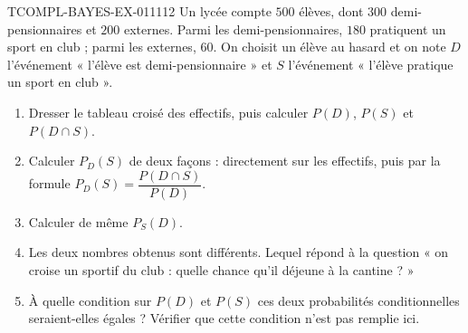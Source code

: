 \begin{exercice}{TCOMPL-BAYES-EX-011}{1}{12}
Un lycée compte $500$ élèves, dont $300$ demi-pensionnaires et $200$ externes.
Parmi les demi-pensionnaires, $180$ pratiquent un sport en club ; parmi les
externes, $60$. On choisit un élève au hasard et on note $D$ l'événement « l'élève
est demi-pensionnaire » et $S$ l'événement « l'élève pratique un sport en club ».
\begin{enumerate}
  \item Dresser le tableau croisé des effectifs, puis calculer $P(D)$, $P(S)$ et
    $P(D\cap S)$.
  \item Calculer $P_D(S)$ de deux façons : directement sur les effectifs, puis
    par la formule $P_D(S)=\dfrac{P(D\cap S)}{P(D)}$.
  \item Calculer de même $P_S(D)$.
  \item Les deux nombres obtenus sont différents. Lequel répond à la question
    « on croise un sportif du club : quelle chance qu'il déjeune à la cantine ? »
  \item À quelle condition sur $P(D)$ et $P(S)$ ces deux probabilités
    conditionnelles seraient-elles égales ? Vérifier que cette condition n'est
    pas remplie ici.
\end{enumerate}
\end{exercice}
